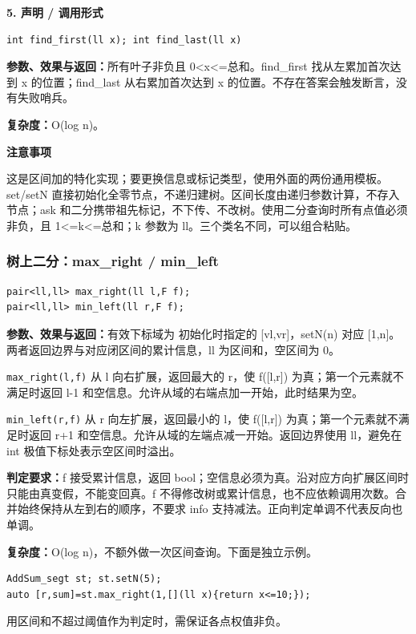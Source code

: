 \documentclass[UTF8,a4paper,10pt]{ctexart}
\newcommand{\TemplNote}[1]{\textbf{注意事项}\par #1\par}
\begin{document}
\noindent\begin{minipage}{\textwidth}
\textbf{5. 声明 / 调用形式}
\begin{lstlisting}
int find_first(ll x); int find_last(ll x)
\end{lstlisting}
\textbf{参数、效果与返回：}所有叶子非负且 0<x<=总和。find\_first 找从左累加首次达到 x 的位置；find\_last 从右累加首次达到 x 的位置。不存在答案会触发断言，没有失败哨兵。

\textbf{复杂度：}O(log n)。

\TemplNote{这是区间加的特化实现；要更换信息或标记类型，使用外面的两份通用模板。set/setN 直接初始化全零节点，不递归建树。区间长度由递归参数计算，不存入节点；ask 和二分携带祖先标记，不下传、不改树。使用二分查询时所有点值必须非负，且 1<=k<=总和；k 参数为 ll。三个类名不同，可以组合粘贴。}
\end{minipage}\par\vspace{0.4em}

\noindent\begin{minipage}{\textwidth}
\subsubsection*{树上二分：max\_right / min\_left}
\begin{lstlisting}
pair<ll,ll> max_right(ll l,F f);
pair<ll,ll> min_left(ll r,F f);
\end{lstlisting}
\textbf{参数、效果与返回：}有效下标域为 初始化时指定的 [vl,vr]，setN(n) 对应 [1,n]。两者返回边界与对应闭区间的累计信息，ll 为区间和，空区间为 0。

\texttt{max\_right(l,f)} 从 l 向右扩展，返回最大的 r，使 f([l,r]) 为真；第一个元素就不满足时返回 l-1 和空信息。允许从域的右端点加一开始，此时结果为空。

\texttt{min\_left(r,f)} 从 r 向左扩展，返回最小的 l，使 f([l,r]) 为真；第一个元素就不满足时返回 r+1 和空信息。允许从域的左端点减一开始。返回边界使用 ll，避免在 int 极值下标处表示空区间时溢出。

\textbf{判定要求：}f 接受累计信息，返回 bool；空信息必须为真。沿对应方向扩展区间时只能由真变假，不能变回真。f 不得修改树或累计信息，也不应依赖调用次数。合并始终保持从左到右的顺序，不要求 info 支持减法。正向判定单调不代表反向也单调。

\textbf{复杂度：}O(log n)，不额外做一次区间查询。下面是独立示例。
\begin{lstlisting}
AddSum_segt st; st.setN(5);
auto [r,sum]=st.max_right(1,[](ll x){return x<=10;});
\end{lstlisting}
用区间和不超过阈值作为判定时，需保证各点权值非负。
\end{minipage}\par
\clearpage
\end{document}
